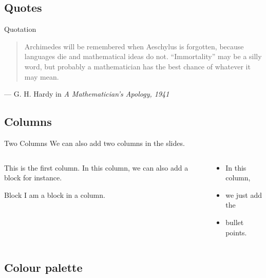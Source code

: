 \documentclass[]{beamer}
\begin{document}
\subsection{Quotes}

\begin{frame}{Quotation}

	\begin{quote}
		Archimedes will be remembered when Aeschylus is forgotten, because languages die and mathematical ideas do not. ``Immortality'' may be a silly word, but probably a mathematician has the best chance of whatever it may mean.
	\end{quote}
	\hfill --- G. H. Hardy in \textit{A Mathematician's Apology, 1941}

\end{frame}

\subsection{Columns}

	\begin{frame}{Two Columns}
		We can also add two columns in the slides.
		\begin{columns}[t]
			\begin{column}[T]{0.4\textwidth}
				This is the first column. In this column, we can also add a block for instance.
				\vspace{1em}
				\begin{block}{Block}
					I am a block in a column.
				\end{block}
			\end{column}
			\begin{column}[T]{0.4\textwidth}
				\begin{itemize}
					\item In this column,
					\item we just add the
					\item bullet points.
				\end{itemize}
			\end{column}
		\end{columns}
	\end{frame}

\subsection{Colour palette}
\end{document}
